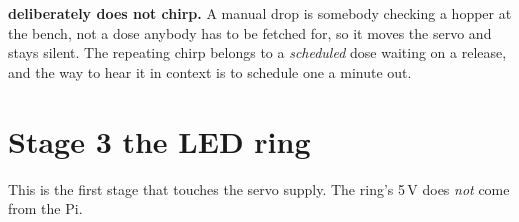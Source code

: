 \documentclass[11pt,a4paper]{article}
\begin{document}
\vspace{1mm}
\begin{notebox}
\textbf{\sffamily {} deliberately does not chirp.} A manual
drop is somebody checking a hopper at the bench, not a dose anybody has to be
fetched for, so it moves the servo and stays silent. The repeating chirp belongs
to a \emph{scheduled} dose waiting on a release, and the way to hear it in
context is to schedule one a minute out.
\end{notebox}

\section{Stage 3 \textemdash{} the LED ring}

This is the first stage that touches the servo supply. The ring's 5\,V does
\emph{not} come from the Pi.
\end{document}
